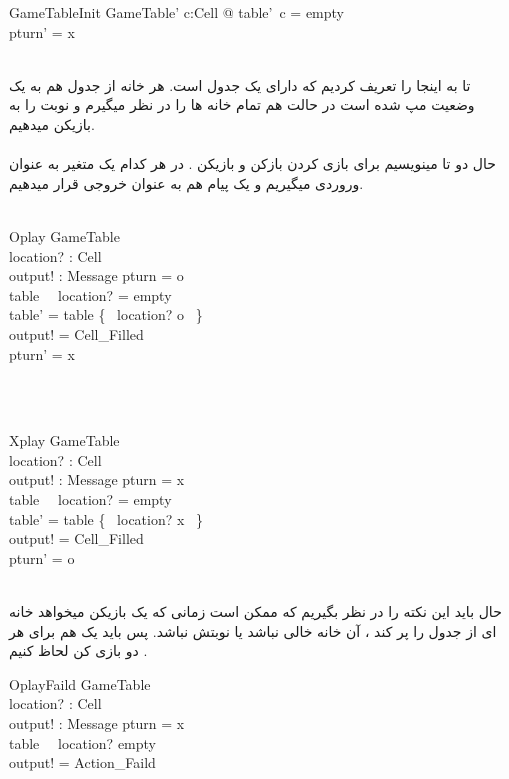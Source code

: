 \documentclass{article}
\begin{document}
\begin{schema}{GameTableInit}
GameTable'
\where
\forall c:Cell @ table'~c = empty\\
pturn' = x
\end{schema}
\\
تا به اینجا  را تعریف کردیم که دارای یک جدول است. هر خانه از جدول هم به یک وضعیت مپ شده است در حالت  هم تمام خانه ها را  در نظر میگیرم و نوبت را به بازیکن  میدهیم.
\\
\\
حال دو تا  مینویسیم برای بازی کردن بازکن  و بازیکن  . در هر کدام یک متغیر  به عنوان وروردی میگیریم و یک پیام  هم به عنوان خروجی قرار میدهیم.
\\
\\
\begin{schema}{Oplay}
\Delta GameTable\\
location? : Cell\\
output! : Message
\where
pturn = o\\
table~ ~location? = empty\\
table' = table \oplus \{~ location? \mapsto o ~\}\\
output! = Cell\_Filled\\
pturn' = x
\end{schema}
\\
\\
\begin{schema}{Xplay}
\Delta GameTable\\
location? : Cell\\
output! : Message
\where
pturn = x\\
table~ ~location? = empty\\
table' = table \oplus \{~ location? \mapsto x ~\}\\
output! = Cell\_Filled\\
pturn' = o
\end{schema}
\\
حال باید این نکته را در نظر بگیریم که ممکن است زمانی که یک بازیکن میخواهد خانه ای از جدول را پر کند ، آن خانه خالی نباشد یا نوبتش نباشد. پس باید یک  هم برای هر دو بازی کن لحاظ کنیم .
\\

\begin{schema}{OplayFaild}
\Xi GameTable\\
location? : Cell\\
output! : Message
\where
pturn = x\\
table~ ~location? \neq empty\\
output! = Action\_Faild
\end{schema}
\end{document}

